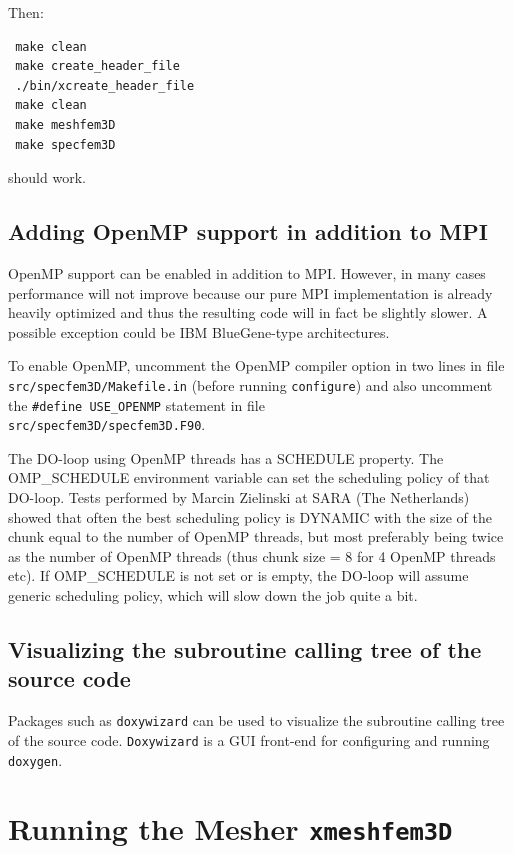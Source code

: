 \documentclass[oneside,english]{book}
\begin{document}
\noindent
Then:

\begin{verbatim}
 make clean
 make create_header_file
 ./bin/xcreate_header_file
 make clean
 make meshfem3D
 make specfem3D
\end{verbatim}

\noindent
should work.

\section{Adding OpenMP support in addition to MPI}

OpenMP support can be enabled in addition to MPI. However, in many cases performance will not improve
because our pure MPI implementation is already heavily optimized and thus the resulting code will in fact
be slightly slower. A possible exception could be IBM BlueGene-type architectures.

To enable OpenMP, uncomment the OpenMP compiler option in two lines in file \texttt{src/specfem3D/Makefile.in}
(before running \texttt{configure}) and also uncomment the \texttt{\#define USE\_OPENMP} statement in file\\
\texttt{src/specfem3D/specfem3D.F90}.

The DO-loop using OpenMP threads has a SCHEDULE property. The OMP\_SCHEDULE
environment variable can set the scheduling policy of that DO-loop.
Tests performed by Marcin Zielinski at SARA (The Netherlands) showed that often
the best scheduling policy is DYNAMIC with the size of the chunk equal to the number of
OpenMP threads, but most preferably being twice as the number of
OpenMP threads (thus chunk size = 8 for 4 OpenMP threads etc).
If OMP\_SCHEDULE is not set or is empty, the DO-loop will assume generic
scheduling policy, which will slow down the job quite a bit.

\section{Visualizing the subroutine calling tree of the source code}

Packages such as \texttt{doxywizard} can be used to visualize the subroutine calling tree of the source code.
\texttt{Doxywizard} is a GUI front-end for configuring and running \texttt{doxygen}.

\chapter{\label{cha:Running-the-Mesher}Running the Mesher \texttt{xmeshfem3D}}
\end{document}
